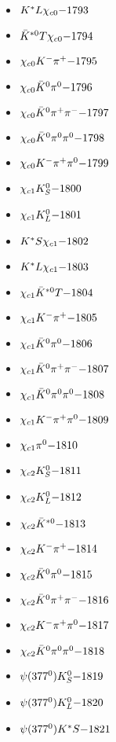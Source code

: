 \begin{multicols}{3}
\begin{itemize}
 \item $ K^{*}L \chi_{c0} \hfill{-1793}$
 \item $ \bar{K}^{*0}T \chi_{c0} \hfill{-1794}$
 \item $ \chi_{c0} K^{-} \pi^{+} \hfill{-1795}$
 \item $ \chi_{c0} \bar{K}^{0} \pi^{0} \hfill{-1796}$
 \item $ \chi_{c0} \bar{K}^{0} \pi^{+} \pi^{-} \hfill{-1797}$
 \item $ \chi_{c0} \bar{K}^{0} \pi^{0} \pi^{0} \hfill{-1798}$
 \item $ \chi_{c0} K^{-} \pi^{+} \pi^{0} \hfill{-1799}$
 \item $ \chi_{c1} K_{S}^{0} \hfill{-1800}$
 \item $ \chi_{c1} K_{L}^{0} \hfill{-1801}$
 \item $ K^{*}S \chi_{c1} \hfill{-1802}$
 \item $ K^{*}L \chi_{c1} \hfill{-1803}$
 \item $ \chi_{c1} \bar{K}^{*0}T \hfill{-1804}$
 \item $ \chi_{c1} K^{-} \pi^{+} \hfill{-1805}$
 \item $ \chi_{c1} \bar{K}^{0} \pi^{0} \hfill{-1806}$
 \item $ \chi_{c1} \bar{K}^{0} \pi^{+} \pi^{-} \hfill{-1807}$
 \item $ \chi_{c1} \bar{K}^{0} \pi^{0} \pi^{0} \hfill{-1808}$
 \item $ \chi_{c1} K^{-} \pi^{+} \pi^{0} \hfill{-1809}$
 \item $ \chi_{c1} \pi^{0} \hfill{-1810}$
 \item $ \chi_{c2} K_{S}^{0} \hfill{-1811}$
 \item $ \chi_{c2} K_{L}^{0} \hfill{-1812}$
 \item $ \chi_{c2} \bar{K}^{*0} \hfill{-1813}$
 \item $ \chi_{c2} K^{-} \pi^{+} \hfill{-1814}$
 \item $ \chi_{c2} \bar{K}^{0} \pi^{0} \hfill{-1815}$
 \item $ \chi_{c2} \bar{K}^{0} \pi^{+} \pi^{-} \hfill{-1816}$
 \item $ \chi_{c2} K^{-} \pi^{+} \pi^{0} \hfill{-1817}$
 \item $ \chi_{c2} \bar{K}^{0} \pi^{0} \pi^{0} \hfill{-1818}$
 \item $ \psi(377^{0}) K_{S}^{0} \hfill{-1819}$
 \item $ \psi(377^{0}) K_{L}^{0} \hfill{-1820}$
 \item $ \psi(377^{0}) K^{*}S \hfill{-1821}$

\end{itemize}
\end{multicols}
